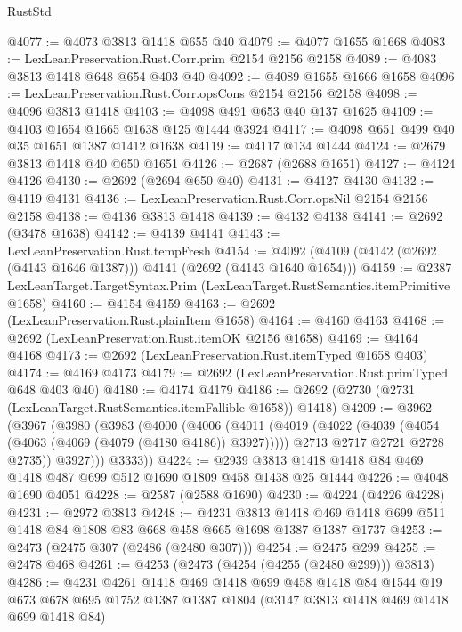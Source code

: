 \begin{lexlean}{RustStd}
\begin{coremodule}
@4077 := @4073 @3813 @1418 @655 @40
@4079 := @4077 @1655 @1668
@4083 := LexLeanPreservation.Rust.Corr.prim @2154 @2156 @2158
@4089 := @4083 @3813 @1418 @648 @654 @403 @40
@4092 := @4089 @1655 @1666 @1658
@4096 := LexLeanPreservation.Rust.Corr.opsCons @2154 @2156 @2158
@4098 := @4096 @3813 @1418
@4103 := @4098 @491 @653 @40 @137 @1625
@4109 := @4103 @1654 @1665 @1638 @125 @1444 @3924
@4117 := @4098 @651 @499 @40 @35 @1651 @1387 @1412 @1638
@4119 := @4117 @134 @1444
@4124 := @2679 @3813 @1418 @40 @650 @1651
@4126 := @2687 (@2688 @1651)
@4127 := @4124 @4126
@4130 := @2692 (@2694 @650 @40)
@4131 := @4127 @4130
@4132 := @4119 @4131
@4136 := LexLeanPreservation.Rust.Corr.opsNil @2154 @2156 @2158
@4138 := @4136 @3813 @1418
@4139 := @4132 @4138
@4141 := @2692 (@3478 @1638)
@4142 := @4139 @4141
@4143 := LexLeanPreservation.Rust.tempFresh
@4154 := @4092 (@4109 (@4142 (@2692 (@4143 @1646 @1387))) @4141 (@2692 (@4143 @1640 @1654)))
@4159 := @2387 LexLeanTarget.TargetSyntax.Prim (LexLeanTarget.RustSemantics.itemPrimitive @1658)
@4160 := @4154 @4159
@4163 := @2692 (LexLeanPreservation.Rust.plainItem @1658)
@4164 := @4160 @4163
@4168 := @2692 (LexLeanPreservation.Rust.itemOK @2156 @1658)
@4169 := @4164 @4168
@4173 := @2692 (LexLeanPreservation.Rust.itemTyped @1658 @403)
@4174 := @4169 @4173
@4179 := @2692 (LexLeanPreservation.Rust.primTyped @648 @403 @40)
@4180 := @4174 @4179
@4186 := @2692 (@2730 (@2731 (LexLeanTarget.RustSemantics.itemFallible @1658)) @1418)
@4209 := @3962
    (@3967
      (@3980
        (@3983
          (@4000
            (@4006
              (@4011
                (@4019
                  (@4022 (@4039 (@4054 (@4063 (@4069 (@4079 (@4180 @4186)) @3927)))))
                  @2713
                  @2717
                  @2721
                  @2728
                  @2735))
              @3927)))
        @3333))
@4224 := @2939 @3813 @1418 @1418 @84 @469 @1418 @487 @699 @512 @1690 @1809 @458 @1438 @25 @1444
@4226 := @4048 @1690 @4051
@4228 := @2587 (@2588 @1690)
@4230 := @4224 (@4226 @4228)
@4231 := @2972 @3813
@4248 := @4231
    @3813
    @1418
    @469
    @1418
    @699
    @511
    @1418
    @84
    @1808
    @83
    @668
    @458
    @665
    @1698
    @1387
    @1387
    @1737
@4253 := @2473 (@2475 @307 (@2486 (@2480 @307)))
@4254 := @2475 @299
@4255 := @2478 @468
@4261 := @4253 (@2473 (@4254 (@4255 (@2480 @299))) @3813)
@4286 := @4231
    @4261
    @1418
    @469
    @1418
    @699
    @458
    @1418
    @84
    @1544
    @19
    @673
    @678
    @695
    @1752
    @1387
    @1387
    @1804
    (@3147 @3813 @1418 @469 @1418 @699 @1418 @84)

\end{coremodule}
\end{lexlean}
